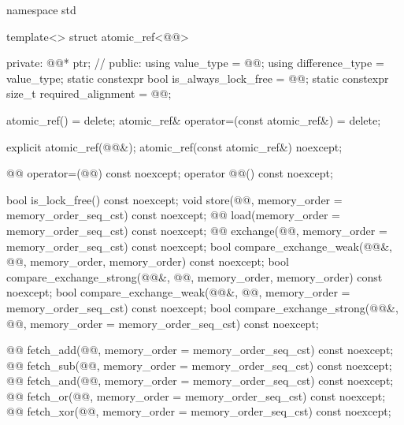 \begin{codeblock}
namespace std {
  template<> struct atomic_ref<@@> {
  private:
    @@* ptr;        // \expos
  public:
    using value_type = @@;
    using difference_type = value_type;
    static constexpr bool is_always_lock_free = @@;
    static constexpr size_t required_alignment = @@;

    atomic_ref() = delete;
    atomic_ref& operator=(const atomic_ref&) = delete;

    explicit atomic_ref(@@&);
    atomic_ref(const atomic_ref&) noexcept;

    @@ operator=(@@) const noexcept;
    operator @@() const noexcept;

    bool is_lock_free() const noexcept;
    void store(@@, memory_order = memory_order_seq_cst) const noexcept;
    @@ load(memory_order = memory_order_seq_cst) const noexcept;
    @@ exchange(@@,
                      memory_order = memory_order_seq_cst) const noexcept;
    bool compare_exchange_weak(@@&, @@,
                               memory_order, memory_order) const noexcept;
    bool compare_exchange_strong(@@&, @@,
                                 memory_order, memory_order) const noexcept;
    bool compare_exchange_weak(@@&, @@,
                               memory_order = memory_order_seq_cst) const noexcept;
    bool compare_exchange_strong(@@&, @@,
                                 memory_order = memory_order_seq_cst) const noexcept;

    @@ fetch_add(@@,
                       memory_order = memory_order_seq_cst) const noexcept;
    @@ fetch_sub(@@,
                       memory_order = memory_order_seq_cst) const noexcept;
    @@ fetch_and(@@,
                       memory_order = memory_order_seq_cst) const noexcept;
    @@ fetch_or(@@,
                      memory_order = memory_order_seq_cst) const noexcept;
    @@ fetch_xor(@@,
                       memory_order = memory_order_seq_cst) const noexcept;

}}
\end{codeblock}
